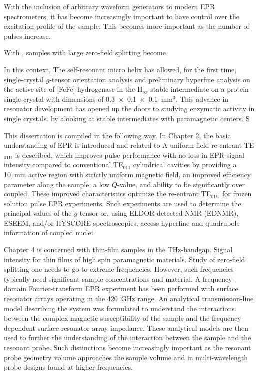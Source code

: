 With the inclusion of arbitrary waveform generators to modern EPR spectrometers, it has become increasingly important to have control over the excitation profile of the sample. This becomes more important as the number of pulses increase.

With , samples with large zero-field splitting become 

In this context, The self-resonant micro helix has allowed, for the first time, single-crystal $g$-tensor orientation analysis and preliminary hyperfine analysis on the active site of [FeFe]-hydrogenase in the H$_{ox}$ stable intermediate on a protein single-crystal with dimensions of 0.3~$\times$~0.1~$\times$~0.1~mm$^3$. This advance in resonator development has opened up the doors to studying enzymatic activity in single crystals. by alooking at stable intermediates with paramagnetic centers. S








This dissertation is compiled in the following way. In Chapter 2, the basic understanding of EPR is introduced and related to A uniform field re-entrant TE$_{\text{01U}}$ is described, which improves pulse performance with no loss in EPR signal intensity compared to conventional TE$_{011}$ cylindrical cavities by providing a 10~mm active region with strictly uniform magnetic field, an improved efficiency parameter along the sample, a low $Q$-value, and ability to be significantly over coupled. These improved characteristics optimize the re-entrant TE$_{\text{01U}}$ for frozen solution pulse EPR experiments. Such experiments are used to determine the principal values of the $g$-tensor or, using ELDOR-detected NMR (EDNMR), ESEEM, and/or HYSCORE spectroscopies, access hyperfine and quadrupole information of coupled nuclei. 

Chapter 4 is concerned with thin-film samples in the THz-bandgap. Signal intensity for thin films of high spin paramagnetic materials. Study of zero-field splitting one needs to go to extreme frequencies. However, such frequencies typically need significant sample concentrations and material. A frequency-domain Fourier-transform EPR experiment has been performed with surface resonator arrays operating in the 420~GHz range. An analytical transmission-line model describing the system was formulated to understand the interactions between the complex magnetic susceptibility of the sample and the frequency-dependent surface resonator array impedance. These analytical models are then used to further the understanding of the interaction between the sample and the resonant probe. Such distinctions become increasingly important as the resonant probe geometry volume approaches the sample volume and in multi-wavelength probe designs found at higher frequencies. 

